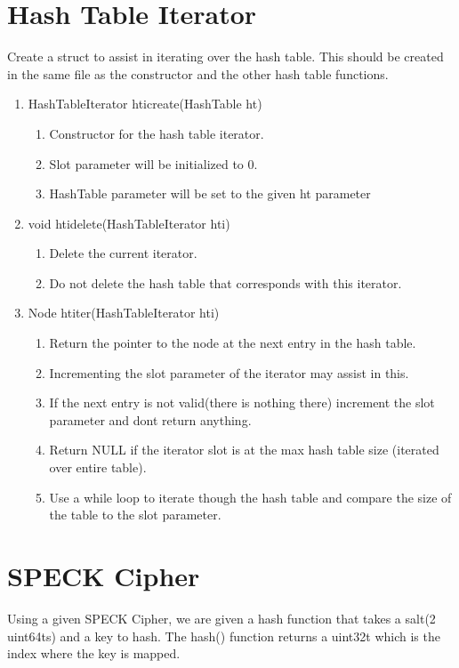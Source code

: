 \documentclass[11pt]{article}
\begin{document}
\section{Hash Table Iterator}\label{ss:iterator}
Create a struct to assist in iterating over the hash table. This should be created in the same file as the constructor and the other hash table functions.
\begin{enumerate}
\item HashTableIterator hticreate(HashTable ht)
	\begin{enumerate}
	\item Constructor for the hash table iterator.
	\item Slot parameter will be initialized to 0.
	\item HashTable parameter will be set to the given ht parameter
	\end{enumerate}
\item void htidelete(HashTableIterator hti)
	\begin{enumerate}
	\item Delete the current iterator.
	\item Do not delete the hash table that corresponds with this iterator.
	\end{enumerate}
\item Node htiter(HashTableIterator hti)
	\begin{enumerate}
	\item Return the pointer to the node at the next entry in the hash table.
	\item Incrementing the slot parameter of the iterator may assist in this.
	\item If the next entry is not valid(there is nothing there) increment the slot parameter and dont return anything.
	\item Return NULL if the iterator slot is at the max hash table size (iterated over entire table).
	\item Use a while loop to iterate though the hash table and compare the size of the table to the slot parameter.
	\end{enumerate}
\end{enumerate}

\section{SPECK Cipher}\label{ss:speck}
Using a given SPECK Cipher, we are given a hash function that takes a salt(2 uint64ts) and a key to hash. The hash() function returns a uint32t which is the index where the key is mapped.
\end{document}
